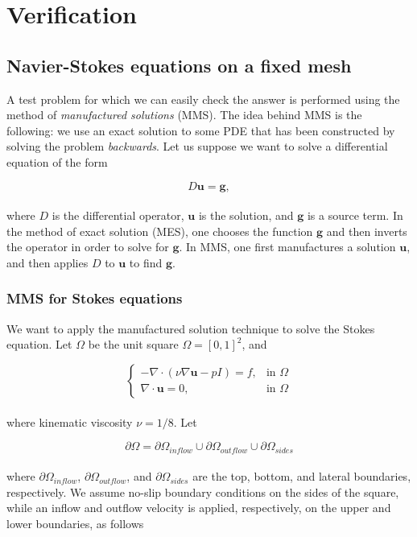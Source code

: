 \documentclass[a4paper,11pt,oneside]{book}
\begin{document}
\chapter{Verification}

\section{Navier-Stokes equations on a fixed mesh}


A test problem for which we can easily check the answer is performed using the method of \textit{manufactured solutions} (MMS). The idea behind MMS is the following: we use an exact solution to some PDE that has been constructed by solving the problem \textit{backwards}. Let us suppose we want to solve a differential equation of the form

\[
D \mathbf{u} = \mathbf{g},
\]
\\
where $D$ is the differential operator, $\mathbf{u}$ is the solution, and $\mathbf{g}$ is a source term. In the method of exact solution (MES), one chooses the function $\mathbf{g}$ and then inverts the operator in order to solve for $\mathbf{g}$. In MMS, one first manufactures a solution $\mathbf{u}$, and then applies $D$ to $\mathbf{u}$ to find $\mathbf{g}$. \\




\subsection{MMS for Stokes equations}

We want to apply the manufactured solution technique to solve the Stokes equation. Let $\Omega$ be the unit square $\Omega = [0,1]^2$, and

\vspace{0.2cm}
\[
\begin{cases}
- \nabla \cdot (\nu \nabla \mathbf{u} - pI) = f, & \mbox{in } \Omega \\
\nabla \cdot \mathbf{u} = 0, & \mbox{in } \Omega
\end{cases}
\]
\vspace{0.2cm}
\\
where kinematic viscosity $\nu = 1/8$. Let

\[
\partial \Omega = \partial \Omega_{inflow} \cup \partial \Omega_{outflow} \cup \partial \Omega_{sides}
\]
\\
where $\partial \Omega_{inflow}$, $\partial \Omega_{outflow}$, and $\partial \Omega_{sides}$ are the top, bottom, and lateral boundaries, respectively. We assume no-slip boundary conditions on the sides of the square, while an inflow and outflow velocity is applied, respectively, on the upper and lower boundaries, as follows
\end{document}
